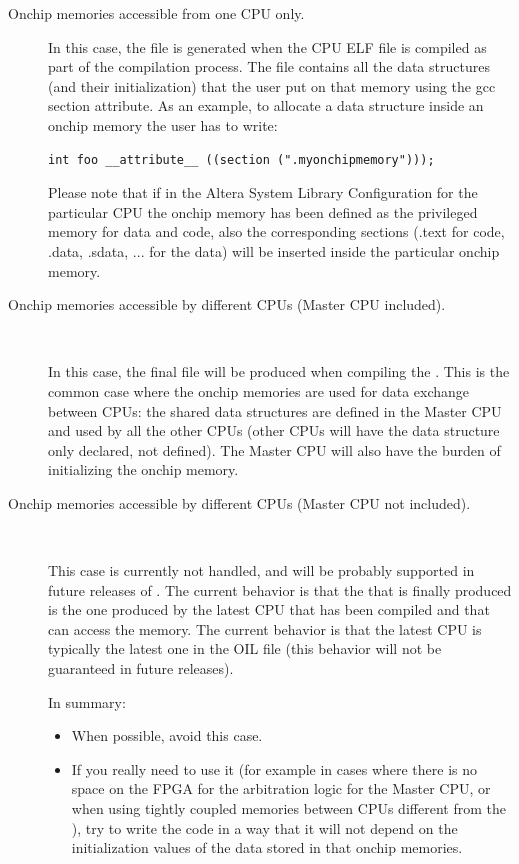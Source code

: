 \begin{description}

\item[Onchip memories accessible from one CPU only.] In this
  case, the  file is generated when the CPU ELF file is
  compiled as part of the compilation process. The  file
  contains all the data structures (and their initialization) that the
  user put on that memory using the gcc section attribute. As an
  example, to allocate a data structure inside an onchip memory the
  user has to write:

  \begin{lstlisting}
int foo __attribute__ ((section (".myonchipmemory")));
  \end{lstlisting}
  Please note that if in the Altera System Library Configuration for
  the particular CPU the onchip memory has been defined as the
  privileged memory for data and code, also the corresponding sections
  (.text for code, .data, .sdata, ... for the data) will be inserted
  inside the particular onchip memory.



\item[Onchip memories accessible by different CPUs
  (Master CPU included).]~ 

  In this case, the final  file will be produced when
  compiling the . This is the
  common case where the onchip memories are used for data exchange
  between CPUs: the shared data structures are defined in the Master
  CPU and used by all the other CPUs (other CPUs will have the data
  structure only declared, not defined).  The Master CPU will also
  have the burden of initializing the onchip memory.


\item[Onchip memories accessible by different CPUs
  (Master CPU not included).]~

  This case is currently not handled, and will be probably supported
  in future releases of \ee. The current behavior is that the
   that is finally produced is the one produced by the
  latest CPU that has been compiled and that can access the
  memory. The current behavior is that the latest CPU is typically the
  latest one in the OIL file (this behavior will not be guaranteed in
  future releases).

  In summary:
  \begin{itemize}
  \item When possible, avoid this case.
  \item If you really need to use it (for example in cases where there
    is no space on the FPGA for the arbitration logic for the Master CPU, or
    when using tightly coupled memories between CPUs different from
    the ), try to write the code in a way that it
    will not depend on the initialization values of the data stored in
    that onchip memories.
  \end{itemize}
\end{description}










